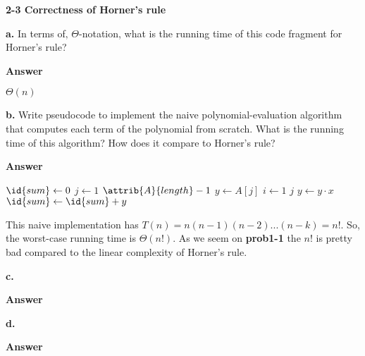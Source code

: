 \documentclass[11pt]{article}          %
\begin{document}

\textbf{2-3 Correctness of Horner’s rule}

\textbf{a.} In terms of‚ $\Theta$-notation, what is the running time of this code fragment for Horner’s rule?

\textbf{Answer}

$\Theta (n)$

\textbf{b.} Write pseudocode to implement the naive polynomial-evaluation algorithm that computes
each term of the polynomial from scratch. What is the running time of this algorithm? How does it
compare to Horner’s rule?

\textbf{Answer}

\begin{codebox}
\li $\id{sum} \gets 0$
\li \For $j \gets 1$ \To $\attrib{A}{length} - 1$
    \Do
\li       $y \gets A[j]$
\li       \For $i \gets 1$ \To $j$
          \Do
\li             $y \gets y \cdot x$
          \End
\li       $\id{sum} \gets \id{sum} + y$
    \End
\end{codebox}

This naive implementation has $T(n) = n (n - 1) (n - 2) ... (n - k) = n!$. So, the worst-case
running time is $\Theta (n!)$. As we seem on \textbf{prob1-1} the $n!$ is pretty bad compared
to the linear complexity of Horner's rule.

\textbf{c.}

\textbf{Answer}

\textbf{d.}

\textbf{Answer}
\end{document}
